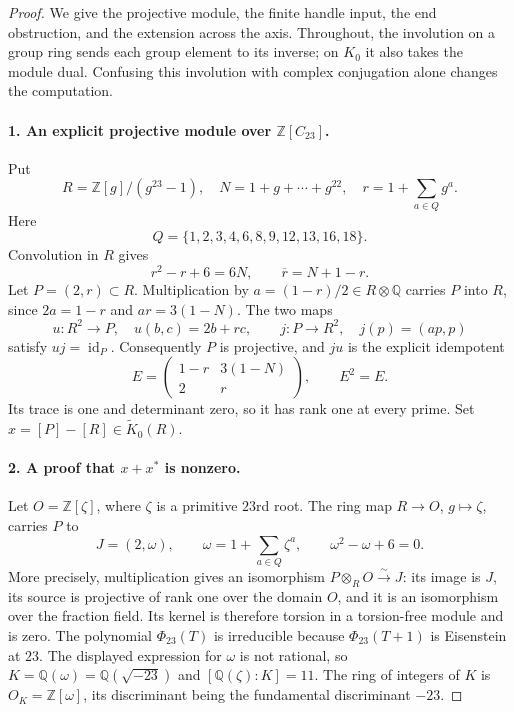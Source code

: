 \begin{proof}
We give the projective module, the finite handle input, the end
obstruction, and the extension across the axis.  Throughout, the
involution on a group ring sends each group element to its inverse;
on $K_0$ it also takes the module dual.  Confusing this involution
with complex conjugation alone changes the computation.

\paragraph{1. An explicit projective module over $\mathbb Z[C_{23}]$.}
Put
\[
 R=\mathbb Z[g]/(g^{23}-1),\quad
 N=1+g+\cdots+g^{22},\quad
 r=1+\sum_{a\in Q}g^a.
\]
Here
\[
 Q=\{1,2,3,4,6,8,9,12,13,16,18\}.
\]
Convolution in $R$ gives
\[
 r^2-r+6=6N,\qquad \overline r=N+1-r.                     \tag{A5.11.2}
\]
Let $P=(2,r)\subset R$.  Multiplication by
$a=(1-r)/2\in R\otimes\mathbb Q$ carries $P$ into $R$,
since $2a=1-r$ and $ar=3(1-N)$.  The two maps
\[
 u:R^2\longrightarrow P,\quad u(b,c)=2b+rc,
 \qquad
 j:P\longrightarrow R^2,\quad j(p)=(ap,p)
\]
satisfy $uj=\operatorname{id}_P$.  Consequently $P$ is projective,
and $ju$ is the explicit idempotent
\[
 E=\begin{pmatrix}1-r&3(1-N)\\2&r\end{pmatrix},\qquad E^2=E.
                                                               \tag{A5.11.3}
\]
Its trace is one and determinant zero, so it has rank one at every
prime.  Set $x=[P]-[R]\in\widetilde K_0(R)$.

\paragraph{2. A proof that $x+x^*$ is nonzero.}
Let $O=\mathbb Z[\zeta]$, where $\zeta$ is a primitive $23$rd root.
The ring map $R\to O$, $g\mapsto\zeta$, carries $P$ to
\[
 J=(2,\omega),\qquad
 \omega=1+\sum_{a\in Q}\zeta^a,
 \qquad \omega^2-\omega+6=0.
\]
More precisely, multiplication gives an isomorphism
$P\otimes_R O\xrightarrow{\sim}J$: its image is $J$, its source
is projective of rank one over the domain $O$, and it is an
isomorphism over the fraction field.  Its kernel is therefore
torsion in a torsion-free module and is zero.
The polynomial $\Phi_{23}(T)$ is irreducible because
$\Phi_{23}(T+1)$ is Eisenstein at $23$.  The displayed expression
for $\omega$ is not rational, so
$K=\mathbb Q(\omega)=\mathbb Q(\sqrt{-23})$ and
$[\mathbb Q(\zeta):K]=11$.  The ring of integers of $K$ is
$O_K=\mathbb Z[\omega]$, its discriminant being the fundamental
discriminant $-23$.


\end{proof}
